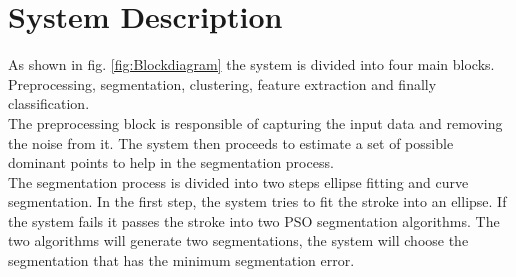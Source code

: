\documentclass[a4paper,10pt]{IEEEconf}
\begin{document}
\section{System Description}
\label{Sysdisc}
As shown in fig. \ref{fig:Blockdiagram} the system is divided into four main blocks. Preprocessing, segmentation, clustering, feature extraction and finally classification. \\
 The preprocessing block is responsible of capturing the input data and removing the noise from it. The system then proceeds to estimate a set of possible dominant points to help in the segmentation process.  \\%
  The segmentation process is divided into two steps ellipse fitting and  curve segmentation. In the first step, the system tries to fit the stroke into an ellipse. If the system fails it passes the stroke into two PSO segmentation algorithms. The two algorithms will generate two segmentations, the system will choose the segmentation that has the minimum segmentation error.%
 
\end{document}
